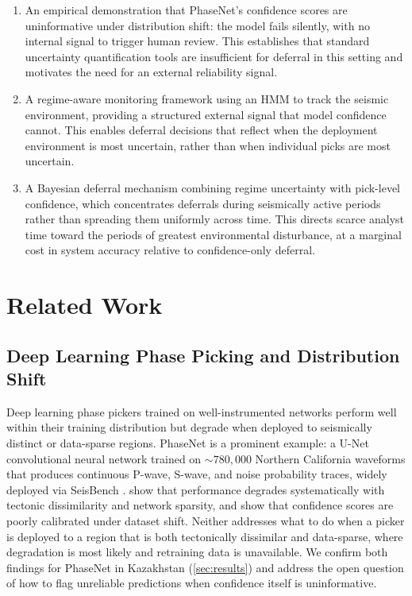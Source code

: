 \begin{enumerate}
    \item An empirical demonstration that PhaseNet's confidence scores are uninformative under distribution shift: the model fails silently, with no internal signal to trigger human review. This establishes that standard uncertainty quantification tools are insufficient for deferral in this setting and motivates the need for an external reliability signal.
    \item A regime-aware monitoring framework using an HMM to track the seismic environment, providing a structured external signal that model confidence cannot. This enables deferral decisions that reflect when the deployment environment is most uncertain, rather than when individual picks are most uncertain.
    \item A Bayesian deferral mechanism combining regime uncertainty with pick-level confidence, which concentrates deferrals during seismically active periods rather than spreading them uniformly across time. This directs scarce analyst time toward the periods of greatest environmental disturbance, at a marginal cost in system accuracy relative to confidence-only deferral.
\end{enumerate}

\section{Related Work}
\label{sec:background}

\subsection{Deep Learning Phase Picking and Distribution Shift}
\label{sec:bg_picking}

Deep learning phase pickers trained on well-instrumented networks perform well within their training distribution but degrade when deployed to seismically distinct or data-sparse regions. PhaseNet \citep{zhu2019phasenet} is a prominent 
example: a U-Net convolutional neural network trained on ${\sim}780{,}000$ Northern California waveforms that produces continuous P-wave, S-wave, and noise probability traces, widely deployed via SeisBench \citep{woollam2022seisbench}. \citet{Munchmeyer2022} show that performance degrades systematically with tectonic dissimilarity and network sparsity, and \citet{ovadia2019uncertainty} show that confidence scores are poorly calibrated under dataset shift. Neither addresses what to do when a picker is deployed to a region that is both tectonically dissimilar and data-sparse, where degradation is most likely and retraining data is unavailable. We confirm both findings for PhaseNet in Kazakhstan (\cref{sec:results}) and address the open question of how to flag unreliable predictions when confidence itself is uninformative.

